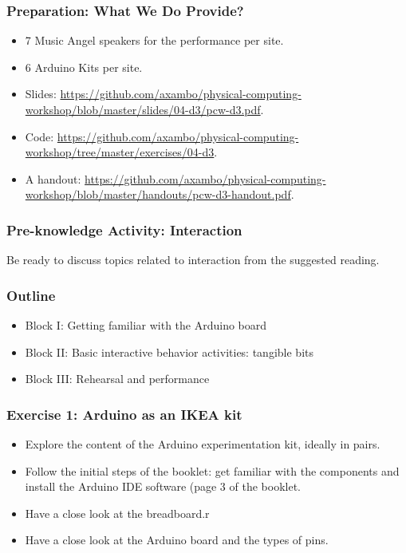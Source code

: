 \documentclass[screen, aspectratio=43]{beamer}
\begin{document}
%
\begin{frame}
  \frametitle{Preparation: What We Do Provide?}
        \begin{itemize}
        \item 7 Music Angel speakers for the performance per site.
        \item 6 Arduino Kits per site.
        \item Slides: \url{https://github.com/axambo/physical-computing-workshop/blob/master/slides/04-d3/pcw-d3.pdf}.
        \item Code: \url{https://github.com/axambo/physical-computing-workshop/tree/master/exercises/04-d3}.
        \item A handout: \url{https://github.com/axambo/physical-computing-workshop/blob/master/handouts/pcw-d3-handout.pdf}.        
         \end{itemize}
\end{frame}
%
\begin{frame}
  \frametitle{Pre-knowledge Activity: Interaction}
  Be ready to discuss topics related to interaction from the suggested reading.
\end{frame}
%
\begin{frame}
  \frametitle{Outline}
      \begin{itemize}
	\item Block I: Getting familiar with the Arduino board
	\item Block II: Basic interactive behavior activities: tangible bits
	\item Block III: Rehearsal and performance
    \end{itemize}  
\end{frame}
%
\begin{frame}
  \frametitle{Exercise 1: Arduino as an IKEA kit}
    \begin{itemize}
    	\item Explore the content of the Arduino experimentation kit, ideally in pairs.
	\item Follow the initial steps of the booklet: get familiar with the components and install the Arduino IDE software (page 3 of the booklet.
	\item Have a close look at the breadboard.r
	\item Have a close look at the Arduino board and the types of pins.
    \end{itemize}
\end{frame}
\end{document}
